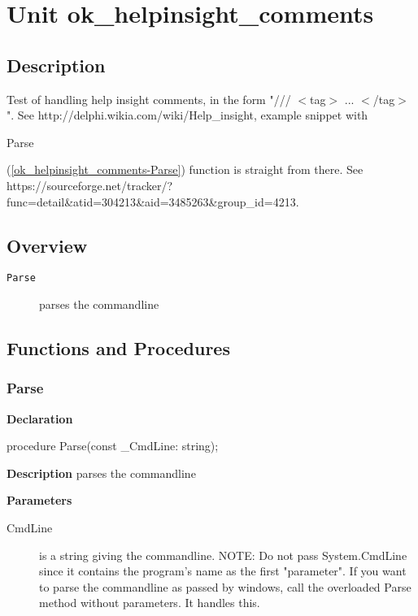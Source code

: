 \documentclass{report}
\begin{document}
\newlength{\tmplength}
\chapter{Unit ok{\_}helpinsight{\_}comments}
\section{Description}
Test of handling help insight comments, in the form "/// {$<$}tag{$>$} ... {$<$}/tag{$>$}". See http://delphi.wikia.com/wiki/Help{\_}insight, example snippet with \begin{ttfamily}Parse\end{ttfamily}(\ref{ok_helpinsight_comments-Parse}) function is straight from there. See https://sourceforge.net/tracker/?func=detail{\&}atid=304213{\&}aid=3485263{\&}group{\_}id=4213.
\section{Overview}
\begin{description}
\item[\texttt{Parse}]parses the commandline
\end{description}
\section{Functions and Procedures}
\subsection*{Parse}
\begin{list}{}{
\setlength{\itemindent}{0cm}
\setlength{\listparindent}{0cm}
\setlength{\leftmargin}{\evensidemargin}
\addtolength{\leftmargin}{\tmplength}
\settowidth{\labelsep}{X}
\addtolength{\leftmargin}{\labelsep}
\setlength{\labelwidth}{\tmplength}
}
\begin{flushleft}
\item[\textbf{Declaration}\hfill]
\begin{ttfamily}
procedure Parse(const {\_}CmdLine: string);\end{ttfamily}


\end{flushleft}
\par
\item[\textbf{Description}]
parses the commandline\hfill\vspace*{1ex}

 \par
\item[\textbf{Parameters}]
\begin{description}
\item[CmdLine] is a string giving the commandline. NOTE: Do not pass System.CmdLine since it contains the program's name as the first "parameter". If you want to parse the commandline as passed by windows, call the overloaded Parse method without parameters. It handles this.
\end{description}


\end{list}
\end{document}
